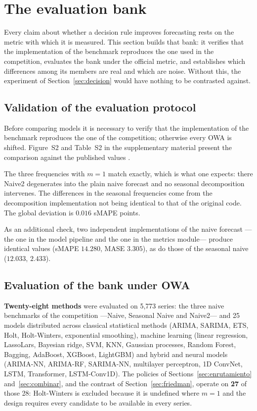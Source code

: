 \section{The evaluation bank}\label{sec:banco}

Every claim about whether a decision rule improves forecasting rests on the metric with
which it is measured. This section builds that bank: it verifies that the implementation
of the benchmark reproduces the one used in the competition, evaluates the bank under the
official metric, and establishes which differences among its members are real and which
are noise. Without this, the experiment of Section~\ref{sec:decision} would have nothing
to be contrasted against.

\subsection{Validation of the evaluation protocol}\label{sec:validacion}

Before comparing models it is necessary to verify that the implementation of the benchmark
reproduces the one of the competition; otherwise every OWA is shifted. Figure~S2 and
Table~S2 in the supplementary material present the comparison against the published values
\cite{makridakis2020}.

The three frequencies with $m=1$ match exactly, which is what one expects: there Naive2
degenerates into the plain naive forecast and no seasonal decomposition intervenes. The
differences in the seasonal frequencies come from the decomposition implementation not
being identical to that of the original code. The global deviation is $0.016$ sMAPE
points.

As an additional check, two independent implementations of the naive forecast ---the one
in the model pipeline and the one in the metrics module--- produce identical values (sMAPE
$14.280$, MASE $3.305$), as do those of the seasonal naive ($12.033$, $2.433$).

\subsection{Evaluation of the bank under OWA}\label{sec:evaluacion}

\textbf{Twenty-eight methods} were evaluated on 5{,}773 series: the three naive benchmarks
of the competition ---Naive, Seasonal Naive and Naive2--- and 25 models distributed across
classical statistical methods (ARIMA, SARIMA, ETS, Holt, Holt-Winters, exponential
smoothing), machine learning (linear regression, LassoLars, Bayesian ridge, SVM, KNN,
Gaussian processes, Random Forest, Bagging, AdaBoost, XGBoost, LightGBM) and hybrid and
neural models (ARIMA-NN, ARIMA-RF, SARIMA-NN, multilayer perceptron, 1D ConvNet, LSTM,
Transformer, LSTM-Conv1D). The policies of Sections~\ref{sec:enrutamiento}
and~\ref{sec:combinar}, and the contrast of Section~\ref{sec:friedman}, operate on
\textbf{27} of those 28: Holt-Winters is excluded because it is undefined where $m=1$ and
the design requires every candidate to be available in every series.

